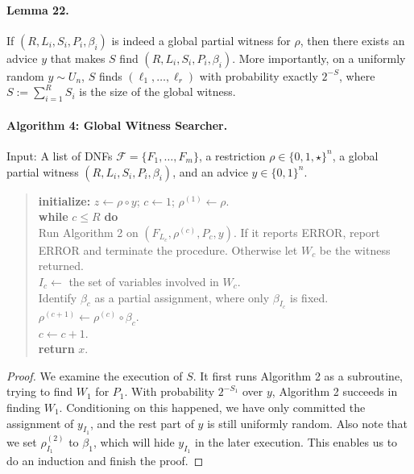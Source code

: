 \paragraph{Lemma 22.} If $(R,L_i,S_i,P_i,\beta_i)$ is indeed a global partial witness for $\rho$, then there exists an advice $y$ that makes $S$ find $(R,L_i,S_i,P_i,\beta_i)$. More importantly, on a uniformly random $y\sim U_n$, $S$ finds $(\ell_1,\ldots,\ell_r)$ with probability exactly $2^{-S}$, where $S:=\sum_{i=1}^RS_i$ is the size of the global witness.
\paragraph{Algorithm 4: Global Witness Searcher.} Input: A list of DNFs $\mathcal F=\{F_1,\ldots,F_m\}$, a restriction $\rho\in\{0,1,\star\}^n$, a global partial witness $(R,L_i,S_i,P_i,\beta_i)$, and an advice $y\in\{0,1\}^n$.
\begin{quote}\textbf{initialize:} $z\leftarrow\rho\circ y$; $c\leftarrow1$; $\rho^{(1)}\leftarrow\rho$.\\
\textbf{while} $c\le R$ \textbf{do}\\
\hspace*{1em}Run Algorithm 2 on $(F_{L_c},\rho^{(c)},P_c,y)$. If it reports ERROR, report ERROR and terminate the procedure. Otherwise let $W_c$ be the witness returned.\\
\hspace*{1em}$I_c\leftarrow$ the set of variables involved in $W_c$.\\
\hspace*{1em}Identify $\beta_c$ as a partial assignment, where only $\beta_{I_c}$ is fixed.\\
\hspace*{1em}$\rho^{(c+1)}\leftarrow\rho^{(c)}\circ\beta_c$.\\
\hspace*{1em}$c\leftarrow c+1$.\\
\textbf{return} $x$.\end{quote}
\begin{proof}We examine the execution of $S$. It first runs Algorithm 2 as a subroutine, trying to find $W_1$ for $P_1$. With probability $2^{-S_1}$ over $y$, Algorithm 2 succeeds in finding $W_1$. Conditioning on this happened, we have only committed the assignment of $y_{I_1}$, and the rest part of $y$ is still uniformly random. Also note that we set $\rho_{I_1}^{(2)}$ to $\beta_1$, which will hide $y_{I_1}$ in the later execution. This enables us to do an induction and finish the proof.\end{proof}
